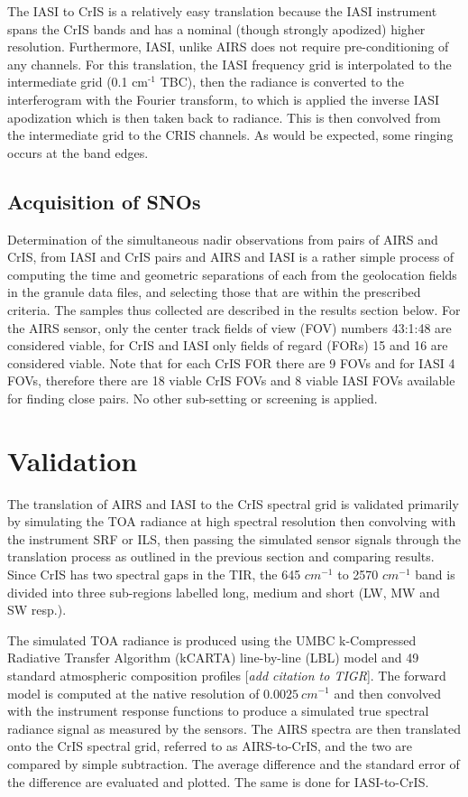 \documentclass[11pt]{article}
\begin{document}
The IASI to CrIS is a relatively easy translation because the IASI instrument spans the CrIS bands and has a nominal (though strongly apodized) higher resolution. Furthermore, IASI, unlike AIRS does not require pre-conditioning of any channels. For this translation, the IASI frequency grid is interpolated to the intermediate grid (0.1 cm\(^{\text{-1}}\) TBC), then the radiance is converted to the interferogram with the Fourier transform, to which is applied the inverse IASI apodization which is then taken back to radiance. This is then convolved from the intermediate grid to the CRIS channels. As would be expected, some ringing occurs at the band edges.

\subsection{Acquisition of SNOs}
\label{sec:orgheadline5}

Determination of the simultaneous nadir observations from pairs of AIRS and CrIS, from IASI and CrIS pairs and AIRS and IASI is a rather simple process of computing the time and geometric separations of each from the geolocation fields in the granule data files, and selecting those that are within the prescribed criteria. The samples thus collected are described in the results section below. For the AIRS sensor, only the center track fields of view (FOV) numbers 43:1:48 are considered viable, for CrIS and IASI only fields of regard (FORs) 15 and 16 are considered viable. Note that for each CrIS FOR there are 9 FOVs and for IASI 4 FOVs, therefore there are 18 viable CrIS FOVs and 8 viable IASI FOVs available for finding close pairs. No other sub-setting or screening is applied.

\section{Validation}
\label{sec:orgheadline7}

The translation of AIRS and IASI to the CrIS spectral grid is validated primarily by simulating the TOA radiance at high spectral resolution then convolving with the instrument SRF or ILS, then passing the simulated sensor signals through the translation process as outlined in the previous section and comparing results. Since CrIS has two spectral gaps in the TIR, the  645 \(cm^{-1}\) to 2570 \(cm^{-1}\) band is divided into three sub-regions labelled long, medium and short (LW, MW and SW resp.).

The simulated TOA radiance is produced using the UMBC k-Compressed Radiative Transfer Algorithm (kCARTA) line-by-line (LBL) model \cite{kcarta1998} and 49 standard atmospheric composition profiles [\textit{add citation to TIGR}]. The forward model is computed at the native resolution of \(0.0025\ cm^{-1}\) and then convolved with the instrument response functions to produce a simulated true spectral radiance signal as measured by the sensors. The AIRS spectra are then translated onto the CrIS spectral grid, referred to as AIRS-to-CrIS, and the two are compared by simple subtraction. The average difference and the standard error of the difference are evaluated and plotted. The same is done for IASI-to-CrIS. 
\end{document}
